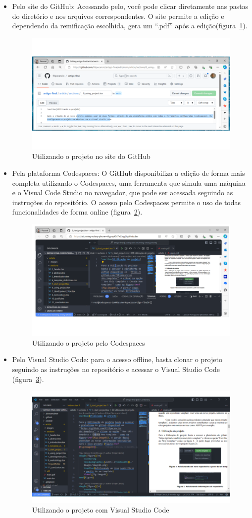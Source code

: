 \begin{itemize}
	\item Pelo  site do GitHub: Acessando pelo, você pode clicar diretamente nas pastas do diretório e nos arquivos correspondentes. O site permite a edição e dependendo da remificação escolhida, gera um ``.pdf'' após a edição(figura~\ref{fig:fig01}).
	
	\begin{figure}[H]
		\centering
		\includegraphics[width=.6\textwidth]{./images/fig03.png}
		\caption{Utilizando o projeto no site do GitHub}
		\label{fig:fig01}
	\end{figure}

	\item Pela plataforma Codespaces: O GitHub disponibiliza a edição  de forma mais completa utilizando o Codespaces, uma ferramenta que simula uma máquina e o Visual Code Studio no navegador, que pode ser acessada seguindo as instruções do repositório. O acesso pelo Codespaces permite o uso de todas funcionalidades de forma online (figura~\ref{fig:fig02}).
	
	\begin{figure}[H]
		\centering
		\includegraphics[width=.6\textwidth]{./images/fig02.png}
		\caption{Utilizando o projeto pelo Codespaces}
		\label{fig:fig02}
	\end{figure}

	\item Pelo Visual Studio Code: para o acesso offline, basta clonar o projeto seguindo as instruções no repositório e acessar o Visual Studio Code (figura~\ref{fig:fig03}).
	
	\begin{figure}[H]
		\centering
		\includegraphics[width=.6\textwidth]{./images/fig01.png}
		\caption{Utilizando o projeto com Visual Studio Code}
		\label{fig:fig03}
	\end{figure}
\end{itemize}